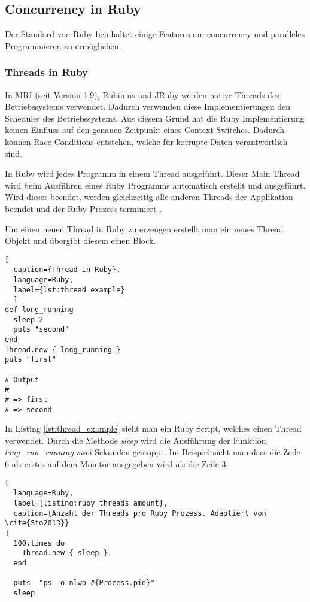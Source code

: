 \subsection{Concurrency in Ruby}
Der Standard von Ruby beinhaltet einige Features um concurrency und paralleles Programmieren zu ermöglichen.

\subsubsection{Threads in Ruby}
In MRI (seit Version 1.9), Rubinius und JRuby werden native Threads des Betriebssystems verwendet. Dadurch verwenden diese Implementierungen den Scheduler des Betriebssystems. Aus diesem Grund hat die Ruby Implementierung keinen Einfluss auf den genauen Zeitpunkt eines Context-Switches. Dadurch können Race Conditions entstehen, welche für korrupte Daten verantwortlich sind.

In Ruby wird jedes Programm in einem Thread ausgeführt. Dieser Main Thread wird beim Ausführen eines Ruby Programms automatisch erstellt und ausgeführt. Wird dieser beendet, werden gleichzeitig alle anderen Threads der Applikation beendet und der Ruby Prozess terminiert \cite[p. 15]{Sto2013}.

Um einen neuen Thread in Ruby zu erzeugen erstellt man ein neues Thread Objekt und übergibt diesem einen Block. 

\begin{lstlisting}[
  caption={Thread in Ruby}, 
  language=Ruby,
  label={lst:thread_example}
  ]
def long_running
  sleep 2
  puts "second"
end
Thread.new { long_running }
puts "first"

# Output
#
# => first
# => second

\end{lstlisting}

In Listing \ref{lst:thread_example} sieht man ein Ruby Script, welches einen Thread verwendet. Durch die Methode \emph{sleep} wird die Ausführung der Funktion \textit{long\_run\_running} zwei Sekunden gestoppt. Im Beispiel sieht man dass die Zeile 6 als erstes auf dem Monitor ausgegeben wird als die Zeile 3. 

\begin{lstlisting}[
  language=Ruby,
  label={listing:ruby_threads_amount},
  caption={Anzahl der Threads pro Ruby Prozess. Adaptiert von \cite{Sto2013}}
]
  100.times do
    Thread.new { sleep }
  end
  
  puts  "ps -o nlwp #{Process.pid}"
  sleep
\end{lstlisting} 

